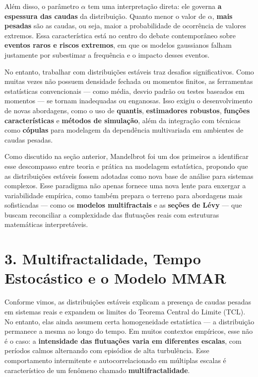 \documentclass[
  portuguese,
]{agujournal2019}
\begin{document}
Além disso, o parâmetro \(\alpha\) tem uma interpretação direta: ele
governa \textbf{a espessura das caudas} da distribuição. Quanto menor o
valor de \(\alpha\), \textbf{mais pesadas} são as caudas, ou seja, maior
a probabilidade de ocorrência de valores extremos. Essa característica
está no centro do debate contemporâneo sobre \textbf{eventos raros e
riscos extremos}, em que os modelos gaussianos falham justamente por
subestimar a frequência e o impacto desses eventos.

No entanto, trabalhar com distribuições estáveis traz desafios
significativos. Como muitas vezes não possuem densidade fechada ou
momentos finitos, as ferramentas estatísticas convencionais --- como
média, desvio padrão ou testes baseados em momentos --- se tornam
inadequadas ou enganosas. Isso exigiu o desenvolvimento de novas
abordagens, como o uso de \textbf{quantis}, \textbf{estimadores
robustos}, \textbf{funções características} e \textbf{métodos de
simulação}, além da integração com técnicas como \textbf{cópulas} para
modelagem da dependência multivariada em ambientes de caudas pesadas.

Como discutido na seção anterior, Mandelbrot foi um dos primeiros a
identificar esse descompasso entre teoria e prática na modelagem
estatística, propondo que as distribuições estáveis fossem adotadas como
nova base de análise para sistemas complexos. Esse paradigma não apenas
fornece uma nova lente para enxergar a variabilidade empírica, como
também prepara o terreno para abordagens mais sofisticadas --- como os
\textbf{modelos multifractais} e as \textbf{seções de Lévy} --- que
buscam reconciliar a complexidade das flutuações reais com estruturas
matemáticas interpretáveis.

\section{3. Multifractalidade, Tempo Estocástico e o Modelo
MMAR}\label{multifractalidade-tempo-estocuxe1stico-e-o-modelo-mmar}

Conforme vimos, as distribuições estáveis explicam a presença de caudas
pesadas em sistemas reais e expandem os limites do Teorema Central do
Limite (TCL). No entanto, elas ainda assumem certa homogeneidade
estatística --- a distribuição permanece a mesma ao longo do tempo. Em
muitos contextos empíricos, esse não é o caso: a \textbf{intensidade das
flutuações varia em diferentes escalas}, com períodos calmos alternando
com episódios de alta turbulência. Esse comportamento intermitente e
autocorrelacionado em múltiplas escalas é característico de um fenômeno
chamado \textbf{multifractalidade}.
\end{document}
